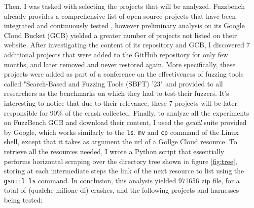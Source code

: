 \newpage
Then, I was tasked with selecting the projects that will be analyzed.
\newline
Fuzzbench already provides a comprehensive list of open-source projects that have been integrated and continuously tested \cite{benchmarks}, however preliminary analysis on its Google Cloud Bucket (GCB) yielded a greater number of projects not listed on their website.
\newline
After investigating the content of its repository and GCB, I discovered 7 additional projects that were added to the GitHub repository for only few months, and later removed and never restored again. More specifically, these projects were added as part of a conference on the effectiveness of fuzzing tools called "Search-Based and Fuzzing Tools (SBFT) '23" \cite{sbft23} and provided to all researchers as the benchmarks on which they had to test their fuzzers.
\newline
It's interesting to notice that due to their relevance, these 7 projects will be later responsible for 90\% of the crash collected.
\newline \newline
Finally, to analyze all the experiments on FuzzBench GCB and download their content, I used the \textit{gsutil} suite provided by Google, which works similarly to the \verb|ls|, \verb|mv| and \verb|cp| command of the Linux shell, except that it takes as argument the url of a Gollge Cloud resource.
\newline
To retrieve all the resources needed, I wrote a Python script that essentially performs horizontal scraping over the directory tree shown in figure \ref{fig:tree}, storing at each intermediate steps the link of the next resource to list using the \verb|gsutil ls| command.
\newline \newline \newline
In conclusion, this analysis yielded 971656 zip file, for a total of (qualche milione di) crashes, and the following projects and harnesses being tested:
\newline
\noindent

